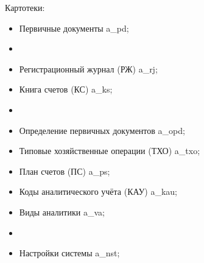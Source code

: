 Картотеки:

\begin{itemize}
    \item Первичные документы \gpiFIO\/a\_pd;
    \item[]\hspace{0pt}
    \item Регистрационный журнал (РЖ) \gpiFIO\/a\_rj;
    \item Книга счетов (КС) \gpiFIO\/a\_ks;
    \item[]\hspace{0pt}
    \item Определение первичных документов \gpiFIO\/a\_opd;
    \item Типовые хозяйственные операции (ТХО) \gpiFIO\/a\_txo;
    \item План счетов (ПС) \gpiFIO\/a\_ps;
    \item Коды аналитического учёта (КАУ) \gpiFIO\/a\_kau;
    \item Виды аналитики \gpiFIO\/a\_va;
    \item[]\hspace{0pt}
    \item Настройки системы \gpiFIO\/a\_nst;
\end{itemize}

